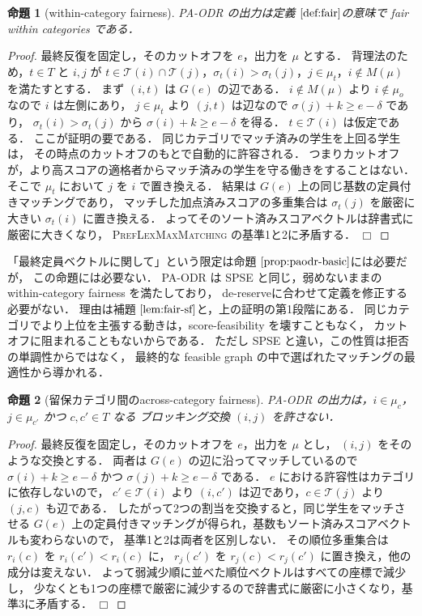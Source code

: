 \documentclass[
    12pt,          %
    a4paper,       %
    oneside,       %
    onecolumn,     %
    titlepage,     %
    final          %
]{jreport} %
\newcommand{\refdefinition}[1]{定義 $\ref{#1}$}
\newcommand{\refpropositional}[1]{命題 $\ref{#1}$}
\newcommand{\reflemma}[1]{補題 $\ref{#1}$}
\newtheorem{proof}{証明}[chapter]
\newtheorem{proposition}{命題}[chapter]
\newcommand{\qed}{\hfill $\Box$ \par}
\renewcommand{\T}{\mathcal{T}}   %
\begin{document}
\begin{proposition}[within-category fairness]
\label{prop:paodr-fair}
PA-ODR の出力は\refdefinition{def:fair}の意味で fair within categories である．
\end{proposition}

\begin{proof}
最終反復を固定し，そのカットオフを $e$，出力を $\mu$ とする．
背理法のため，$t\in T$ と $i,j$ が
$t\in\T(i)\cap\T(j)$，$\sigma_t(i)>\sigma_t(j)$，$j\in\mu_t$，$i\notin M(\mu)$
を満たすとする．
まず $(i,t)$ は $G(e)$ の辺である．
$i\notin M(\mu)$ より $i\notin\mu_o$ なので $i$ は左側にあり，
$j\in\mu_t$ より $(j,t)$ は辺なので $\sigma(j)+k\ge e-\delta$ であり，
$\sigma_t(i)>\sigma_t(j)$ から $\sigma(i)+k\ge e-\delta$ を得る．
$t\in\T(i)$ は仮定である．
ここが証明の要である．
同じカテゴリでマッチ済みの学生を上回る学生は，
その時点のカットオフのもとで自動的に許容される．
つまりカットオフが，より高スコアの適格者からマッチ済みの学生を守る働きをすることはない．
そこで $\mu_t$ において $j$ を $i$ で置き換える．
結果は $G(e)$ 上の同じ基数の定員付きマッチングであり，
マッチした加点済みスコアの多重集合は $\sigma_t(j)$ を厳密に大きい $\sigma_t(i)$ に置き換える．
よってそのソート済みスコアベクトルは辞書式に厳密に大きくなり，
\textsc{PrefLexMaxMatching} の基準1と2に矛盾する．
\qed
\end{proof}

「最終定員ベクトルに関して」という限定は\refpropositional{prop:paodr-basic}には必要だが，
この命題には必要ない．
PA-ODR は SPSE と同じ，弱めないままの within-category fairness を満たしており，
de-reserveに合わせて定義を修正する必要がない．
理由は\reflemma{lem:fair-sf}と，上の証明の第1段階にある．
同じカテゴリでより上位を主張する動きは，score-feasibility を壊すこともなく，
カットオフに阻まれることもないからである．
ただし SPSE と違い，この性質は拒否の単調性からではなく，
最終的な feasible graph の中で選ばれたマッチングの最適性から導かれる．

\begin{proposition}[留保カテゴリ間のacross-category fairness]
\label{prop:paodr-swap}
PA-ODR の出力は，$i\in\mu_c$，$j\in\mu_{c'}$ かつ $c,c'\in T$ なる
ブロッキング交換 $(i,j)$ を許さない．
\end{proposition}

\begin{proof}
最終反復を固定し，そのカットオフを $e$，出力を $\mu$ とし，
$(i,j)$ をそのような交換とする．
両者は $G(e)$ の辺に沿ってマッチしているので
$\sigma(i)+k\ge e-\delta$ かつ $\sigma(j)+k\ge e-\delta$ である．
$e$ における許容性はカテゴリに依存しないので，
$c'\in\T(i)$ より $(i,c')$ は辺であり，$c\in\T(j)$ より $(j,c)$ も辺である．
したがって2つの割当を交換すると，同じ学生をマッチさせる
$G(e)$ 上の定員付きマッチングが得られ，基数もソート済みスコアベクトルも変わらないので，
基準1と2は両者を区別しない．
その順位多重集合は $r_i(c)$ を $r_i(c')<r_i(c)$ に，
$r_j(c')$ を $r_j(c)<r_j(c')$ に置き換え，他の成分は変えない．
よって弱減少順に並べた順位ベクトルはすべての座標で減少し，
少なくとも1つの座標で厳密に減少するので辞書式に厳密に小さくなり，基準3に矛盾する．
\qed
\end{proof}
\end{document}
